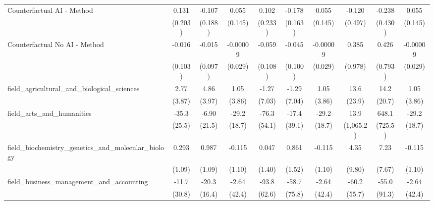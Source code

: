 \begin{tabular}{lccccccccc}
   Counterfactual AI - Method                                  & 0.131        & -0.107        & 0.055         & 0.102       & -0.178       & 0.055         & -0.120    & -0.238  & 0.055\\   
                                                               & (0.203)      & (0.188)       & (0.145)       & (0.233)     & (0.163)      & (0.145)       & (0.497)   & (0.430) & (0.145)\\   
   Counterfactual No AI - Method                               & -0.016       & -0.015        & -0.00009      & -0.059      & -0.045       & -0.00009      & 0.385     & 0.426   & -0.00009\\   
                                                               & (0.103)      & (0.097)       & (0.029)       & (0.108)     & (0.100)      & (0.029)       & (0.978)   & (0.793) & (0.029)\\   
   field\_agricultural\_and\_biological\_sciences              & 2.77         & 4.86          & 1.05          & -1.27       & -1.29        & 1.05          & 13.6      & 14.2    & 1.05\\   
                                                               & (3.87)       & (3.97)        & (3.86)        & (7.03)      & (7.04)       & (3.86)        & (23.9)    & (20.7)  & (3.86)\\   
   field\_arts\_and\_humanities                                & -35.3        & -6.90         & -29.2         & -76.3       & -17.4        & -29.2         & 13.9      & 648.1   & -29.2\\   
                                                               & (25.5)       & (21.5)        & (18.7)        & (54.1)      & (39.1)       & (18.7)        & (1,065.2) & (725.5) & (18.7)\\   
   field\_biochemistry\_genetics\_and\_molecular\_biology      & 0.293        & 0.987         & -0.115        & 0.047       & 0.861        & -0.115        & 4.35      & 7.23    & -0.115\\   
                                                               & (1.09)       & (1.09)        & (1.10)        & (1.40)      & (1.52)       & (1.10)        & (9.80)    & (7.67)  & (1.10)\\   
   field\_business\_management\_and\_accounting                & -11.7        & -20.3         & -2.64         & -93.8       & -58.7        & -2.64         & -60.2     & -55.0   & -2.64\\   
                                                               & (30.8)       & (16.4)        & (42.4)        & (62.6)      & (75.8)       & (42.4)        & (55.7)    & (91.3)  & (42.4)\\   

\end{tabular}
